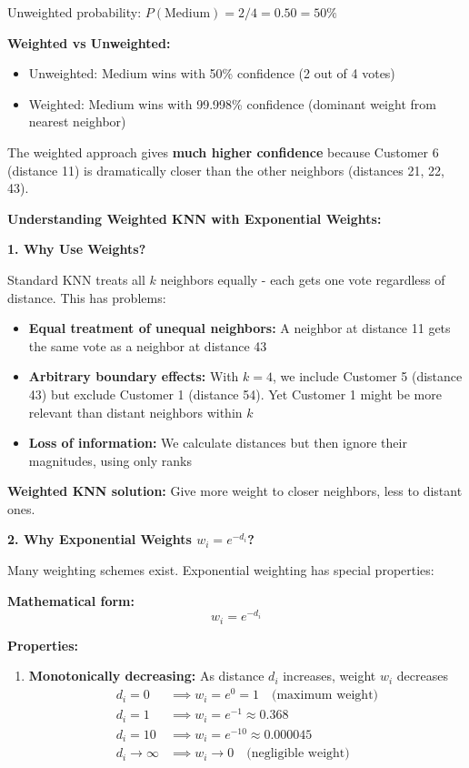 \documentclass[12pt]{article}
\begin{document}
\begin{solution}
Unweighted probability: \(P(\text{Medium}) = 2/4 = 0.50 = 50\%\)

\textbf{Weighted vs Unweighted:}
\begin{itemize}
    \item Unweighted: Medium wins with 50\% confidence (2 out of 4 votes)
    \item Weighted: Medium wins with 99.998\% confidence (dominant weight from nearest neighbor)
\end{itemize}

The weighted approach gives \textbf{much higher confidence} because Customer 6 (distance 11) is dramatically closer than the other neighbors (distances 21, 22, 43).
\end{solution}

\begin{explanation}
\textbf{Understanding Weighted KNN with Exponential Weights:}

\textbf{1. Why Use Weights?}

Standard KNN treats all \(k\) neighbors equally - each gets one vote regardless of distance. This has problems:

\begin{itemize}
    \item \textbf{Equal treatment of unequal neighbors:} A neighbor at distance 11 gets the same vote as a neighbor at distance 43
    \item \textbf{Arbitrary boundary effects:} With \(k=4\), we include Customer 5 (distance 43) but exclude Customer 1 (distance 54). Yet Customer 1 might be more relevant than distant neighbors within \(k\)
    \item \textbf{Loss of information:} We calculate distances but then ignore their magnitudes, using only ranks
\end{itemize}

\textbf{Weighted KNN solution:} Give more weight to closer neighbors, less to distant ones.

\textbf{2. Why Exponential Weights \(w_i = e^{-d_i}\)?}

Many weighting schemes exist. Exponential weighting has special properties:

\textbf{Mathematical form:}
\[
w_i = e^{-d_i}
\]

\textbf{Properties:}

\begin{enumerate}
    \item \textbf{Monotonically decreasing:} As distance \(d_i\) increases, weight \(w_i\) decreases
    \begin{align*}
        d_i = 0 &\implies w_i = e^0 = 1 \quad \text{(maximum weight)} \\
        d_i = 1 &\implies w_i = e^{-1} \approx 0.368 \\
        d_i = 10 &\implies w_i = e^{-10} \approx 0.000045 \\
        d_i \to \infty &\implies w_i \to 0 \quad \text{(negligible weight)}
    \end{align*}


\end{enumerate}
\end{explanation}
\end{document}

